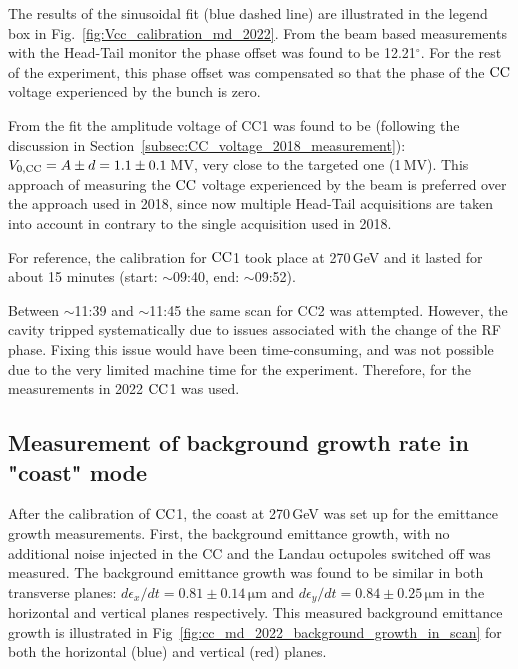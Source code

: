 The results of the sinusoidal fit (blue dashed line) are illustrated in the legend box in Fig.~\ref{fig:Vcc_calibration_md_2022}. From the beam based measurements with the Head-Tail monitor the phase offset was found to be 12.21$^\circ$. For the rest of the experiment, this phase offset was compensated so that the phase of the ${\mathrm{CC}}$ voltage experienced by the bunch is zero. 


From the fit the amplitude voltage of CC1 was found to be (following the discussion in Section~\ref{subsec:CC_voltage_2018_measurement}): ${V_\mathrm{0, CC}}=A \pm d = 1.1 \pm 0.1$\,MV, very close to the targeted one (1\,MV). This approach of measuring the ${\mathrm{CC}}$ voltage experienced by the beam is preferred over the approach used in 2018, since now multiple Head-Tail acquisitions are taken into account in contrary to the single acquisition used in 2018.  



For reference, the calibration for ${\mathrm{CC}}$1 took place at 270\,GeV and it lasted for about 15 minutes (start: $\sim$09:40, end: $\sim$09:52).

Between $\sim$11:39 and $\sim$11:45 the same scan for CC2 was attempted. However, the cavity tripped systematically due to issues associated with the change of the RF phase. Fixing this issue would have been time-consuming, and was not possible due to the very limited machine time for the experiment. Therefore, for the measurements in 2022 ${\mathrm{CC}}$1 was used.


\subsection{Measurement of background growth rate in "coast" mode}\label{subsec:measured_background_growth_cc_md_2022}
After the calibration of ${\mathrm{CC}}$1, the coast at 270\,GeV was set up for the emittance growth measurements. First, the background emittance growth, with no additional noise injected in the CC and the Landau octupoles switched off was measured. The background emittance growth was found to be similar in both transverse planes: $d\epsilon_x /dt=0.81 \pm 0.14$\,$\mathrm{\mu m}$ and $d\epsilon_y /dt=0.84 \pm0.25$\,$\mathrm{\mu m}$ in the horizontal and vertical planes respectively. This measured background emittance growth is illustrated in Fig~\ref{fig:cc_md_2022_background_growth_in_scan} for both the horizontal (blue) and vertical (red) planes.

